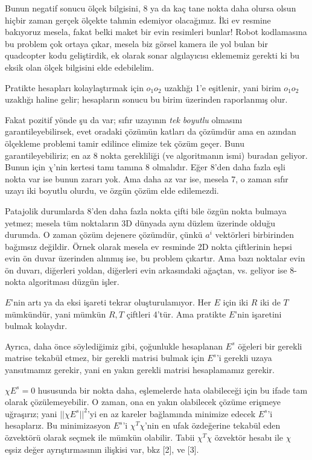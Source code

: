\documentclass[12pt,fleqn]{article}\usepackage{../../common}
\begin{document}
Bunun negatif sonucu ölçek bilgisini, 8 ya da kaç tane nokta daha olursa olsun
hiçbir zaman gerçek ölçekte tahmin edemiyor olacağımız. İki ev resmine bakıyoruz
mesela, fakat belki maket bir evin resimleri bunlar!  Robot kodlamasına bu
problem çok ortaya çıkar, mesela biz görsel kamera ile yol bulan bir quadcopter
kodu geliştirdik, ek olarak sonar algılayıcısı eklememiz gerekti ki bu eksik
olan ölçek bilgisini elde edebilelim.

Pratikte hesapları kolaylaştırmak için $o_1o_2$ uzaklığı 1'e eşitlenir, yani
birim $o_1o_2$ uzaklığı haline gelir; hesapların sonucu bu birim üzerinden
raporlanmış olur.

Fakat pozitif yönde şu da var; sıfır uzayının {\em tek boyutlu} olmasını
garantileyebilirsek, evet oradaki çözümün katları da çözümdür ama en azından
ölçekleme problemi tamir edilince elimize tek çözüm geçer. Bunu
garantileyebiliriz; en az 8 nokta gerekliliği (ve algoritmanın ismi) buradan
geliyor. Bunun için $\chi$'nin kertesi tamı tamına 8 olmalıdır. Eğer 8'den daha
fazla eşli nokta var ise bunun zararı yok. Ama daha az var ise, mesela 7, o
zaman sıfır uzayı iki boyutlu olurdu, ve özgün çözüm elde edilemezdi.

Patajolik durumlarda 8'den daha fazla nokta çifti bile özgün nokta bulmaya
yetmez; mesela tüm noktaların 3D dünyada aynı düzlem üzerinde olduğu durumda. O
zaman çözüm dejenere çözümdür, çünkü $a^i$ vektörleri birbirinden bağımsız
değildir. Örnek olarak mesela ev resminde 2D nokta çiftlerinin hepsi evin ön
duvar üzerinden alınmış ise, bu problem çıkartır. Ama bazı noktalar evin ön
duvarı, diğerleri yoldan, diğerleri evin arkasındaki ağaçtan, vs. geliyor ise
8-nokta algoritması düzgün işler.

$E$'nin artı ya da eksi işareti tekrar oluşturulamıyor. Her $E$ için iki $R$ iki
de $T$ mümkündür, yani mümkün $R,T$ çiftleri 4'tür. Ama pratikte $E$'nin
işaretini bulmak kolaydır.

Ayrıca, daha önce söylediğimiz gibi, çoğunlukle hesaplanan $E^s$ öğeleri bir
gerekli matrise tekabül etmez, bir gerekli matrisi bulmak için $E^s$'i gerekli
uzaya yansıtmamız gerekir, yani en yakın gerekli matrisi hesaplamamız gerekir.

$\chi E^s = 0$ hususunda bir nokta daha, eşlemelerde hata olabileceği için
bu ifade tam olarak çözülemeyebilir. O zaman, ona en yakın olabilecek
çözüme erişmeye uğraşırız; yani $||\chi E^s||^2$'yi en az kareler
bağlamında minimize edecek $E^s$'i hesaplarız. Bu minimizasyon $E^s$'i
$\chi^T\chi$'nin en ufak özdeğerine tekabül eden özvektörü olarak seçmek
ile mümkün olabilir. Tabii $\chi^T\chi$ özvektör hesabı ile $\chi$ eşsiz
değer ayrıştırmasının ilişkisi var, bkz [2], ve [3].
\end{document}
